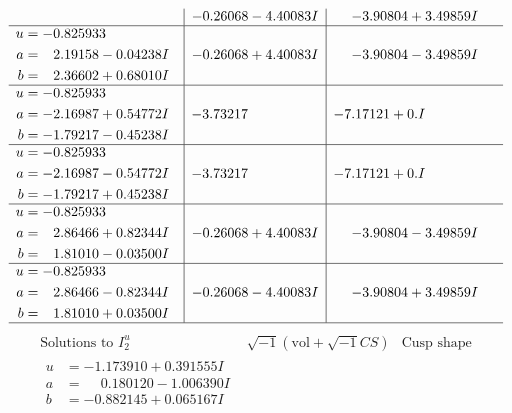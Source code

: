 \documentclass[1p]{elsarticle_modified}
\theoremstyle{definition}
\newcommand{\I}{\sqrt{-1}}
\begin{document}
$$\begin{array}{c|c|c}
 & -0.26068 - 4.40083 I & -3.90804 + 3.49859 I \\ \hline\begin{aligned}
u &= -0.825933\phantom{ +0.000000I} \\
a &= \phantom{-}2.19158 - 0.04238 I \\
b &= \phantom{-}2.36602 + 0.68010 I\end{aligned}
 & -0.26068 + 4.40083 I & -3.90804 - 3.49859 I \\ \hline\begin{aligned}
u &= -0.825933\phantom{ +0.000000I} \\
a &= -2.16987 + 0.54772 I \\
b &= -1.79217 - 0.45238 I\end{aligned}
 & -3.73217\phantom{ +0.000000I} & -7.17121 + 0. I\phantom{ +0.000000I} \\ \hline\begin{aligned}
u &= -0.825933\phantom{ +0.000000I} \\
a &= -2.16987 - 0.54772 I \\
b &= -1.79217 + 0.45238 I\end{aligned}
 & -3.73217\phantom{ +0.000000I} & -7.17121 + 0. I\phantom{ +0.000000I} \\ \hline\begin{aligned}
u &= -0.825933\phantom{ +0.000000I} \\
a &= \phantom{-}2.86466 + 0.82344 I \\
b &= \phantom{-}1.81010 - 0.03500 I\end{aligned}
 & -0.26068 + 4.40083 I & -3.90804 - 3.49859 I \\ \hline\begin{aligned}
u &= -0.825933\phantom{ +0.000000I} \\
a &= \phantom{-}2.86466 - 0.82344 I \\
b &= \phantom{-}1.81010 + 0.03500 I\end{aligned}
 & -0.26068 - 4.40083 I & -3.90804 + 3.49859 I\\
 \hline 
 \end{array}$$\newpage$$\begin{array}{c|c|c}  
\text{Solutions to }I^u_{2}& \I (\text{vol} + \sqrt{-1}CS) & \text{Cusp shape}\\
 \hline 
\begin{aligned}
u &= -1.173910 + 0.391555 I \\
a &= \phantom{-}0.180120 - 1.006390 I \\
b &= -0.882145 + 0.065167 I\end{aligned}

\end{array}$$
\end{document}
